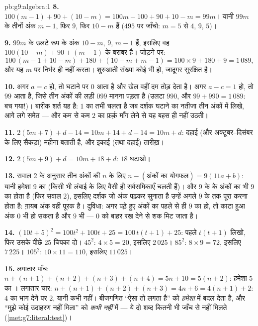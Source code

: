 \begin{solution}{pb:g9:algebra:1}
\textbf{8.} $100(m - 1) + 90 + (10 - m) = 100m - 100 + 90 + 10
- m = 99m$। यानी $99m$ के तीनों अंक $m - 1$, फिर $9$, फिर $10 - m$
हैं ($495$ पर जाँचो: $m = 5$ से $4$, $9$, $5$)।

\textbf{9.} $99m$ के उलटे रूप के अंक $10 - m$, $9$, $m - 1$ हैं,
इसलिए वह $100(10 - m) + 90 + (m - 1)$ के बराबर है। जोड़ने पर:
\[
100\,(m - 1 + 10 - m) + 180 + (10 - m + m - 1)
= 100 \times 9 + 180 + 9 = 1\,089 ,
\]
और यह $m$ पर निर्भर ही नहीं करता। शुरुआती संख्या कोई भी हो, जादूगर
सुरक्षित है।

\textbf{10.} अगर $a = c$ हो, तो घटाने पर $0$ आता है और खेल वहीं दम
तोड़ देता है। अगर $a - c = 1$ हो, तो $99$ आता है, जिसे तीन अंकों की
लड़ी $099$ मानना पड़ता है (उलटा $990$, और $99 + 990 = 1\,089$: बच
गया!)। बारीक शर्त यह है: $1$ का  तभी चलता है जब दर्शक घटाने का
नतीजा तीन अंकों में लिखे, आगे लगे  समेत --- और कम से कम $2$ का
फ़र्क़ माँग लेने से यह बहस ही नहीं उठती।

\textbf{11.} $2(5m + 7) + d - 14 = 10m + 14 + d - 14 =
10m + d$: दहाई (और अक्टूबर--दिसंबर के लिए सैकड़ा) महीना बताती है, और
इकाई (तथा दहाई) तारीख़।

\textbf{12.} $2(5m + 9) + d = 10m + 18 + d$: $18$ घटाओ।

\textbf{13.} सवाल 2 के अनुसार तीन अंकों की $n$ के लिए
$n - (\text{अंकों का योगफल}) = 9(11a + b)$: यानी हमेशा $9$ का 
(किसी भी लंबाई के लिए वैसी ही सर्वसमिकाएँ चलती हैं)। और $9$ के 
के अंकों का  भी $9$ का  होता है (फिर सवाल 2), इसलिए दर्शक
जो अंक पढ़कर सुनाता है उन्हें अगले $9$ के  तक पूरा करना होता है:
ग़ायब अंक वही पूरक है। दुविधा: अगर पढ़े हुए अंकों का  पहले से ही
$9$ का  हो, तो काटा हुआ अंक $0$ भी हो सकता है और $9$ भी --- $0$
को बाहर रख देने से शक मिट जाता है।

\textbf{14.} $(10t + 5)^2 = 100t^2 + 100t + 25 =
100\,t(t + 1) + 25$: पहले $t(t+1)$ लिखो, फिर उसके पीछे $25$ चिपका
दो। $45^2$: $4 \times 5 = 20$, इसलिए $2\,025$। $85^2$:
$8 \times 9 = 72$, इसलिए $7\,225$। $105^2$: $10 \times 11 = 110$,
इसलिए $11\,025$।

\textbf{15.} लगातार पाँच: $n + (n+1) + (n+2) + (n+3) +
(n+4) = 5n + 10 = 5(n + 2)$: हमेशा $5$ का । लगातार चार:
$n + (n+1) + (n+2) + (n+3) = 4n + 6 =
4(n + 1) + 2$: $4$ का भाग देने पर  $2$, यानी कभी  नहीं।
बीजगणित ``ऐसा तो लगता है'' को \emph{हमेशा} में बदल देता है, और
``मुझे कोई उदाहरण नहीं मिला'' को \emph{कभी नहीं} में --- ये दो शब्द
कितनी भी जाँच से नहीं मिलते
(\cref{met:g7:literal:test})।

\end{solution}

